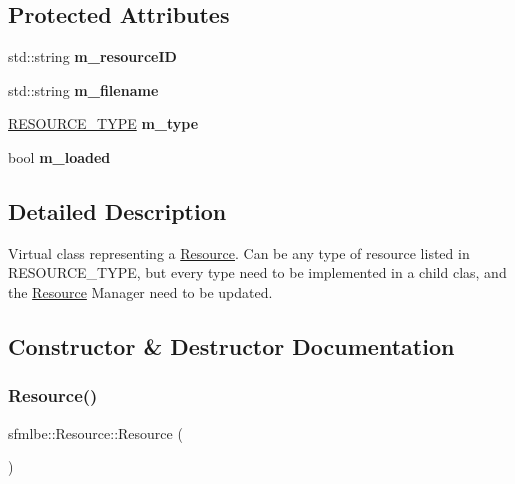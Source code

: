 \subsection*{Protected Attributes}
\begin{DoxyCompactItemize}
\item 
\mbox{\label{classsfmlbe_1_1_resource_a9b6ee23d56d056a440005ac7fb0445ab}} 
std\+::string {\bfseries m\+\_\+resource\+ID}
\item 
\mbox{\label{classsfmlbe_1_1_resource_a6819f8b382e2e471a4209731c5b79064}} 
std\+::string {\bfseries m\+\_\+filename}
\item 
\mbox{\label{classsfmlbe_1_1_resource_a5f995a7e9f6813a2cb3a1d2f01145410}} 
\mbox{\hyperlink{namespacesfmlbe_ac4335ed3060bba025f73e01f9dccb2dd}{R\+E\+S\+O\+U\+R\+C\+E\+\_\+\+T\+Y\+PE}} {\bfseries m\+\_\+type}
\item 
\mbox{\label{classsfmlbe_1_1_resource_a666c78b37688c4c1a389850f193e97ea}} 
bool {\bfseries m\+\_\+loaded}
\end{DoxyCompactItemize}


\subsection{Detailed Description}
Virtual class representing a \mbox{\hyperlink{classsfmlbe_1_1_resource}{Resource}}. Can be any type of resource listed in R\+E\+S\+O\+U\+R\+C\+E\+\_\+\+T\+Y\+PE, but every type need to be implemented in a child clas, and the \mbox{\hyperlink{classsfmlbe_1_1_resource}{Resource}} Manager need to be updated. 

\subsection{Constructor \& Destructor Documentation}
\mbox{\label{classsfmlbe_1_1_resource_afc4c45a3b69da3904ab98d8096a5dbf6}} 
\subsubsection{\texorpdfstring{Resource()}{Resource()}\hspace{0.1cm}{\footnotesize\ttfamily [1/2]}}
{\footnotesize\ttfamily sfmlbe\+::\+Resource\+::\+Resource (\begin{DoxyParamCaption}{ }\end{DoxyParamCaption})\hspace{0.3cm}{\ttfamily [inline]}}



